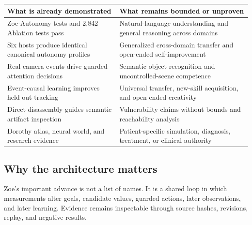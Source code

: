 \documentclass[11pt]{article}
\begin{document}
\begin{center}
\begin{tabularx}{\textwidth}{>{\raggedright\arraybackslash}X>{\raggedright\arraybackslash}X}
\toprule
\textbf{What is already demonstrated} & \textbf{What remains bounded or unproven}\\
\midrule
64 Zoe-Autonomy tests and 2,842 Ablation tests pass & Natural-language understanding and general reasoning across domains\\
Six hosts produce identical canonical autonomy profiles & Generalized cross-domain transfer and open-ended self-improvement\\
Real camera events drive guarded attention decisions & Semantic object recognition and uncontrolled-scene competence\\
Event-causal learning improves held-out tracking & Universal transfer, new-skill acquisition, and open-ended creativity\\
Direct disassembly guides semantic artifact inspection & Vulnerability claims without bounds and reachability analysis\\
Dorothy atlas, neural world, and research evidence & Patient-specific simulation, diagnosis, treatment, or clinical authority\\
\bottomrule
\end{tabularx}
\end{center}

\subsection{Why the architecture matters}

Zoe's important advance is not a list of names. It is a shared loop in which measurements alter goals, candidate values, guarded actions, later observations, and later learning. Evidence remains inspectable through source hashes, revisions, replay, and negative results.
\end{document}

